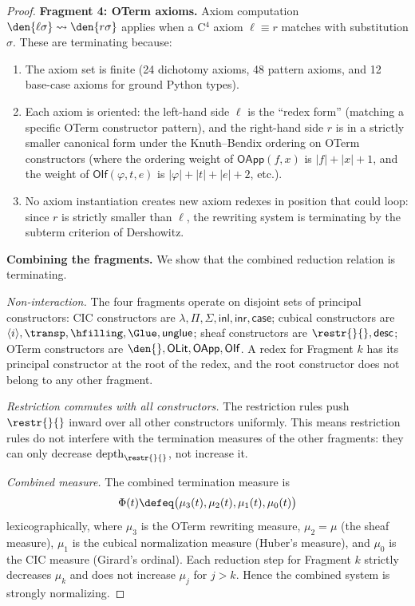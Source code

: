 \begin{proof}
\medskip
\noindent\textbf{Fragment 4: OTerm axioms.}
Axiom computation $\den{\ell\sigma} \rightsquigarrow \den{r\sigma}$
applies when a C$^4$ axiom $\ell \equiv r$ matches with substitution
$\sigma$.  These are terminating because:
\begin{enumerate}
\item The axiom set is finite (24 dichotomy axioms, 48 pattern axioms,
  and 12 base-case axioms for ground Python types).
\item Each axiom is oriented: the left-hand side $\ell$ is the ``redex form''
  (matching a specific OTerm constructor pattern), and the right-hand
  side $r$ is in a strictly smaller canonical form under the Knuth--Bendix
  ordering on OTerm constructors (where the ordering weight of
  $\mathsf{OApp}(f,x)$ is $|f| + |x| + 1$, and the weight of
  $\mathsf{OIf}(\varphi, t, e)$ is $|\varphi| + |t| + |e| + 2$, etc.).
\item No axiom instantiation creates new axiom redexes in position that
  could loop: since $r$ is strictly smaller than $\ell$, the rewriting
  system is terminating by the subterm criterion of Dershowitz.
\end{enumerate}

\medskip
\noindent\textbf{Combining the fragments.}
We show that the combined reduction relation is terminating.

\textit{Non-interaction.}
The four fragments operate on disjoint sets of principal constructors:
CIC constructors are $\lambda, \Pi, \Sigma, \mathsf{inl}, \mathsf{inr}, \mathsf{case}$;
cubical constructors are $\langle i \rangle, \transp, \hfilling, \Glue, \mathsf{unglue}$;
sheaf constructors are $\restr{}{}, \mathsf{desc}$;
OTerm constructors are $\den{}, \mathsf{OLit}, \mathsf{OApp}, \mathsf{OIf}$.
A redex for Fragment $k$ has its principal constructor at the root of the
redex, and the root constructor does not belong to any other fragment.

\textit{Restriction commutes with all constructors.}
The restriction rules push $\restr{}{}$ inward over all other constructors
uniformly.  This means restriction rules do not interfere with the
termination measures of the other fragments: they can only decrease
$\mathrm{depth}_{\restr{}{}}$, not increase it.

\textit{Combined measure.}
The combined termination measure is
\[
  \Phi(t) \defeq \bigl(\mu_3(t), \mu_2(t), \mu_1(t), \mu_0(t)\bigr)
\]
lexicographically, where $\mu_3$ is the OTerm rewriting measure,
$\mu_2 = \mu$ (the sheaf measure), $\mu_1$ is the cubical normalization
measure (Huber's measure), and $\mu_0$ is the CIC measure (Girard's ordinal).
Each reduction step for Fragment $k$ strictly decreases $\mu_k$ and
does not increase $\mu_j$ for $j > k$.  Hence the combined system is
strongly normalizing.
\end{proof}

